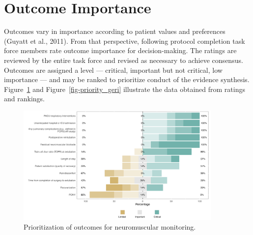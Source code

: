 \documentclass[
  letterpaper,
  DIV=11,
  numbers=noendperiod]{scrreprt}
\begin{document}
\hypertarget{outcome-importance}{%
\section{Outcome Importance}\label{outcome-importance}}

Outcomes vary in importance according to patient values and preferences
(Guyatt et al., 2011). From that perspective, following protocol
completion task force members rate outcome importance for
decision-making. The ratings are reviewed by the entire task force and
revised as necessary to achieve consensus. Outcomes are assigned a level
--- critical, important but not critical, low importance --- and may be
ranked to prioritize conduct of the evidence synthesis.
Figure~\ref{fig-priority} and Figure~\ref{fig-priority_geri} illustrate
the data obtained from ratings and rankings.

\begin{figure}

\caption{\label{fig-priority}Prioritization of outcomes for
neuromuscular monitoring.}

\includegraphics[width=0.9\textwidth,height=\textheight]{assets/priority_nmb.png} \hfill{}

\end{figure}
\end{document}
